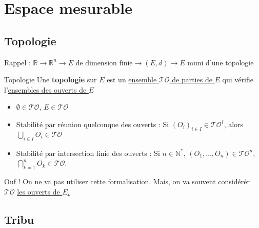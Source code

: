 \label{chap:Intégrabilité}


\section{Espace mesurable} %
\label{sec:Espace mesurable}

\subsection{Topologie} %
\label{sub:Topologie}


Rappel : $\mathbb{R} \to \mathbb{R} ^{n} \to E \text{ de dimension finie} \to (E,d) \to E \text{ muni d'une topologie}$

\begin{Definition}[colbacktitle=red!75!black]{Topologie}{}
  Une \textbf{topologie} sur $E$ est un \underline{ensemble $\mathcal{TO}$ de parties de $E$} qui vérifie l'\underline{ensembles des ouverts de $E$}
  \begin{itemize}

      \item $\emptyset \in \mathcal{TO}$, $E \in \mathcal{TO}$ 
      \item Stabilité par réunion quelconque des ouverts : Si $(O_i) _{i \in I} \in \mathcal{TO} ^{I}$, alors $\bigcup _{i \in I} O_i \in \mathcal{TO}$ 
      \item Stabilité par intersection finie des ouverts : Si $n \in \mathbb{N} ^{*}$, $(O_1, \dots, O_n) \in \mathcal{TO} ^{n}$, $\bigcap _{k=1} ^{n} O_k \in \mathcal{TO}$.

  \end{itemize}
\end{Definition} 

\begin{note}{}{}
Ouf ! On ne va pas utiliser cette formalisation. Mais, on va souvent considérér $\mathcal{TO}$ \underline{les ouverts de $E$.}
\end{note}



\subsection{Tribu} %
\label{sub:Tribu}

